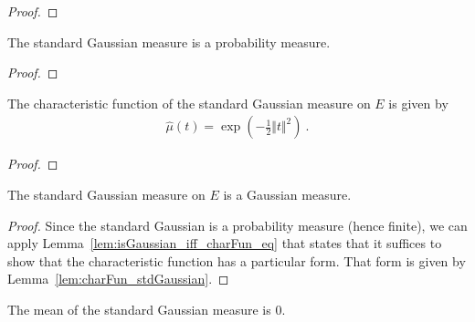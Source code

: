 \begin{proof}\leanok

\end{proof}


\begin{lemma}\label{lem:isProbabilityMeasure_stdGaussian}
  \leanok
The standard Gaussian measure is a probability measure.
\end{lemma}

\begin{proof}\leanok

\end{proof}


\begin{lemma}\label{lem:charFun_stdGaussian}
The characteristic function of the standard Gaussian measure on $E$ is given by
\begin{align*}
  \hat{\mu}(t) = \exp\left(-\frac{1}{2} \Vert t \Vert^2 \right) \: .
\end{align*}
\end{lemma}

\begin{proof}

\end{proof}


\begin{lemma}\label{lem:isGaussian_stdGaussian}
  \leanok
The standard Gaussian measure on $E$ is a Gaussian measure.
\end{lemma}

\begin{proof}
Since the standard Gaussian is a probability measure (hence finite), we can apply Lemma~\ref{lem:isGaussian_iff_charFun_eq} that states that it suffices to show that the characteristic function has a particular form.
That form is given by Lemma~\ref{lem:charFun_stdGaussian}.
\end{proof}


\begin{lemma}\label{lem:integral_id_stdGaussian}
  \leanok
The mean of the standard Gaussian measure is $0$.
\end{lemma}

